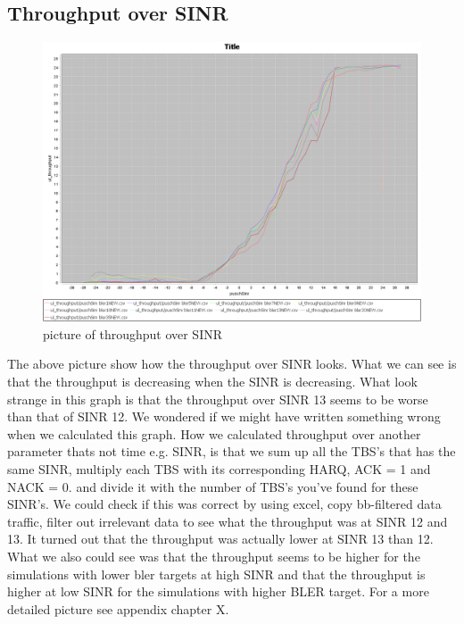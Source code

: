 \documentclass[cropmarks, frame, english]{idamasterthesis}
\begin{document}
\newpage
\subsection{Throughput over SINR}

\begin{figure}[h]
\includegraphics[width=\textwidth]{ulThroughputOverSINR}
\centering
\caption{picture of throughput over SINR}
\end{figure}

The above picture show how the throughput over SINR looks. What we can see is that the throughput is decreasing when the SINR is decreasing. What look strange in this graph is that the throughput over SINR 13 seems to be worse than that of SINR 12. We wondered if we might  have written something wrong when we calculated this graph. How we calculated throughput over another parameter thats not time e.g. SINR, is that we sum up all the TBS's that has the same SINR, multiply each TBS with its corresponding HARQ, ACK = 1 and NACK = 0. and divide it with the number of TBS's you've found for these SINR's. We could check if this was correct by using excel, copy bb-filtered data traffic, filter out irrelevant data to see what the throughput was at SINR 12 and 13. It turned out that the throughput was actually lower at SINR 13 than 12. What we also could see was that the throughput seems to be higher for the simulations with lower bler targets at high SINR and that the throughput is higher at low SINR for the simulations with higher BLER target. For a more detailed picture see appendix chapter X.
\end{document}
